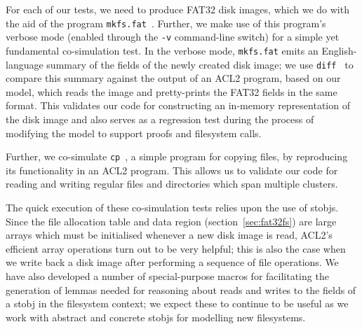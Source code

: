 \documentclass[submission,copyright,creativecommons]{eptcs}
\begin{document}
For each of our tests, we need to produce FAT32 disk images, which we
do with the aid of the program
\texttt{mkfs.fat}~\cite{hudsonmkfs}. Further, we make use of this
program's verbose mode (enabled through the \texttt{-v} command-line
switch) for a simple yet fundamental co-simulation test. In the verbose
mode, \texttt{mkfs.fat} emits an English-language summary of the
fields of the
newly created disk image; we use \texttt{diff}~\cite{eggertdiff} to
compare this summary against the output of an ACL2 program, based on
our model, which reads the image and pretty-prints the FAT32 fields in the
same format. This validates our code for constructing an in-memory
representation of the disk image and also serves as a regression test
during the process of modifying the model to support proofs and
filesystem calls.

Further, we co-simulate \texttt{cp}~\cite{granlundcp}, a simple
program for copying files, by
reproducing its functionality in an ACL2 program. This allows us to
validate our code for reading and writing regular files and
directories which span multiple clusters.

The quick execution of these co-simulation tests relies upon the use
of stobjs. Since the file allocation table and data region
(section~\ref{sec:fat32fs}) are large arrays which must be initialised
whenever a new disk image is read, ACL2's efficient array operations
turn out to be very helpful; this is also the case when we write back
a disk image after performing a sequence of file operations. We have
also developed a number of special-purpose macros for facilitating the
generation of lemmas needed for reasoning about reads and writes to
the fields of a stobj in the filesystem context; we expect these to
continue to be useful as we work with abstract and concrete stobjs for
modelling new filesystems.


\end{document}
